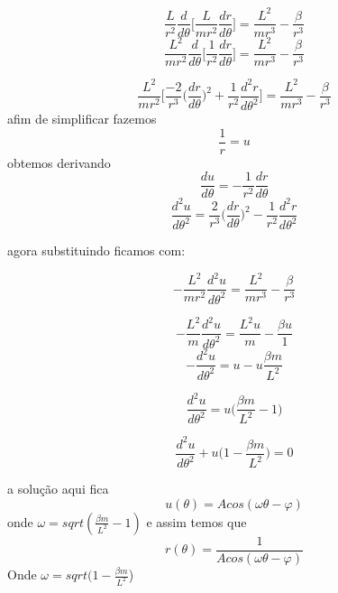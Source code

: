 \documentclass[a4paper,12pt]{exam}
\begin{document}
		
		\[ \frac{L}{r^2}\frac{d}{d\theta} \Big[ \frac{L}{mr^2} \frac{dr}{d\theta} \Big] = \frac{L^2}{mr^3} - \frac{\beta}{r^3} \]
		\[ \frac{L^2}{mr^2}\frac{d}{d\theta} \Big[ \frac{1}{r^2} \frac{dr}{d\theta} \Big]  = \frac{L^2}{mr^3} - \frac{\beta}{r^3} \]
		
		\[ \frac{L^2}{mr^2} \Big[ \frac{-2}{r^3} \Big(\frac{dr}{d\theta}\Big)^2 + \frac{1}{r^2} \frac{d^2r}{d\theta^2} \Big] = \frac{L^2}{mr^3} - \frac{\beta}{r^3} \]
		afim de simplificar fazemos
		\[\frac{1}{r} = u \]
		obtemos derivando
		\[\frac{du}{d\theta} = -\frac{1}{r^2}\frac{dr}{d\theta}  \]
		\[\frac{d^2u}{d\theta^2} = \frac{2}{r^3} \big(\frac{dr}{d\theta}\Big)^2 - \frac{1}{r^2}\frac{d^2r}{d\theta^2}  \]
		
		agora substituindo ficamos com:
		
		\[ -\frac{L^2}{mr^2} \frac{d^2u}{d\theta^2} = \frac{L^2}{mr^3} - \frac{\beta}{r^3} \]
		
		\[ -\frac{L^2}{m} \frac{d^2u}{d\theta^2} = \frac{L^2 u}{m} - \frac{\beta u}{1} \]
		\[ -\frac{d^2u}{d\theta^2} = u - u\frac{\beta m}{L^2} \]
		
		\[ \frac{d^2u}{d\theta^2} = u \Big( \frac{\beta m}{L^2} -1 \Big) \]
		
		\[ \frac{d^2u}{d\theta^2} + u \Big( 1- \frac{\beta m}{L^2} \Big) = 0 \]
		
		a solução aqui fica \[ u(\theta) = Acos(\omega \theta - \varphi) \]
		onde $\omega = sqrt(\frac{\beta m}{L^2} - 1 )$
		e assim temos que
		\[ r(\theta) = \frac{1}{Acos(\omega \theta - \varphi)}\]
		Onde $\omega = sqrt(1- \frac{\beta m}{L^2}$)
		
		
\end{document}

